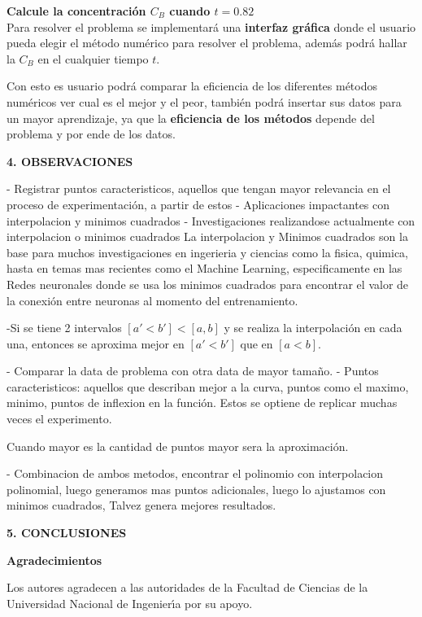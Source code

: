 \documentclass[10pt,a4paper]{article}
\begin{document}
\begin{multicols}{2}
\textbf{Calcule la concentración $C_B$ cuando $t = 0.82$}\\

		
\noindent Para resolver el problema se implementará una \textbf{interfaz gráfica} donde el usuario pueda elegir el método numérico para resolver el problema, además podrá hallar la $C_B$ en el cualquier tiempo $t$.  

\noindent Con esto es usuario podrá comparar la eficiencia de los diferentes métodos numéricos ver cual es el mejor y el peor, también podrá insertar sus datos para un mayor aprendizaje, ya que la \textbf{eficiencia de los métodos} depende del problema y por ende de los datos.

\begin{center}
{\large \bf 4. OBSERVACIONES}
\end{center}

- Registrar puntos caracteristicos, aquellos que tengan mayor relevancia en el proceso de experimentación, a partir de estos 
- Aplicaciones impactantes con interpolacion y minimos cuadrados 
- Investigaciones realizandose actualmente con interpolacion o minimos cuadrados
La interpolacion y Minimos cuadrados son la base para muchos investigaciones en ingerieria y ciencias como la fisica, quimica, hasta en temas mas recientes como el Machine Learning, especificamente en las Redes neuronales donde se usa los minimos cuadrados para encontrar el valor de la conexión entre neuronas al momento del entrenamiento.


-Si se tiene 2 intervalos $[a' < b'] < [a , b] $ y se realiza la interpolación en cada una, entonces se aproxima mejor en $[a'< b']$ que en $[a < b]$.

- Comparar la data de problema con otra data de mayor tamaño.
- Puntos caracteristicos: aquellos que describan mejor a la curva, puntos como el maximo, minimo, puntos de inflexion en la función. Estos se optiene de replicar muchas veces el experimento.

Cuando mayor es la cantidad de puntos mayor sera la aproximación.

- Combinacion de ambos metodos, encontrar el polinomio con interpolacion polinomial, luego generamos mas puntos adicionales, luego lo ajustamos con minimos cuadrados, Talvez genera mejores resultados.



\begin{center}
{\large \bf 5. CONCLUSIONES}
\end{center}

\begin{center}
{\large \bf Agradecimientos}
\end{center}
Los autores agradecen a las autoridades de la Facultad de Ciencias de la Universidad Nacional de 
Ingenier\'{\i}a por su apoyo.

\end{multicols}
\newpage
\end{document}
